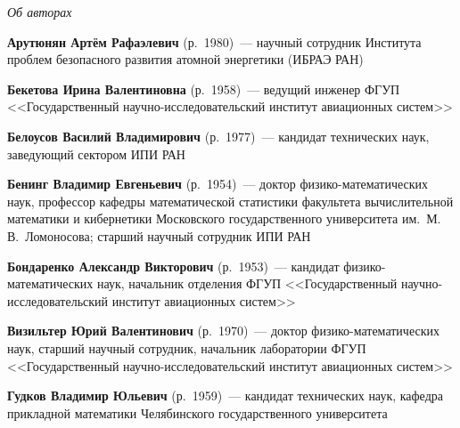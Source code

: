 \begin{center}\LARGE
\textit{Об авторах}
\end{center}
\thispagestyle{empty}


\vspace*{12pt}


\begin{multicols}{2}

\noindent
\textbf{Арутюнян Артём Рафаэлевич} (р.\ 1980)~--- научный
сотрудник Института проблем безопасного развития атомной энергетики 
(ИБРАЭ РАН)

\vspace*{3pt}

\noindent
\textbf{Бекетова Ирина Валентиновна} (р.\ 1958)~--- ведущий инженер
ФГУП <<Государственный научно-ис\-сле\-до\-вательский институт авиационных систем>>

\vspace*{3pt}

\noindent
\textbf{Белоусов Василий Владимирович} (р.\ 1977)~--- кандидат технических наук,  заведующий сектором ИПИ РАН


\noindent
\textbf{Бенинг Владимир Евгеньевич} (р.\ 1954)~---  доктор физико-математических наук, 
профессор ка\-фед\-ры математической статистики факультета вы\-чис\-ли\-тель\-ной 
математики  и кибернетики Московского государственного университета им.\ М.\,В.~Ломоносова;
старший научный сотрудник ИПИ РАН


\noindent
\textbf{Бондаренко Александр Викторович} (р.\ 1953)~--- кандидат фи\-зи\-ко-ма\-те\-ма\-ти\-че\-ских наук,
начальник отделения ФГУП <<Государственный научно-ис\-сле\-до\-вательский институт авиационных систем>>


\noindent
\textbf{Визильтер Юрий Валентинович} (р.\ 1970)~--- доктор фи\-зи\-ко-ма\-те\-ма\-ти\-че\-ских наук, 
старший научный сотрудник, начальник лаборатории
ФГУП <<Государственный научно-исследовательский институт авиационных систем>>


\noindent
\textbf{Гудков Владимир Юльевич} (р.\ 1959)~---  кандидат технических наук,
кафедра прикладной математики Челябинского государственного университета


\end{multicols}

